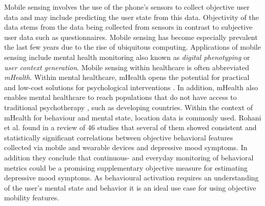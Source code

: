 Mobile sensing involves the use of the phone's sensors to collect objective user data and may include predicting the user state from this data. Objectivity of the data stems from the data being collected from sensors in contrast to subjective user data such as questionnaires. Mobile sensing has become especially prevalent the last few years due to the rise of ubiquitous computing. Applications of mobile sensing include mental health monitoring also known as \textit{digital phenotyping} or \textit{user context generation}. Mobile sensing within healthcare is often abbreviated \textit{mHealth}. Within mental healthcare, mHealth opens the potential for practical and low-cost solutions for psychological interventions \cite{mobile-based-interventions}. In addition, mHealth also enables mental healthcare to reach populations that do not have access to traditional psychotherapy \cite{future-mental-health}, such as developing countries. Within the context of mHealth for behaviour and mental state, location data is commonly used. Rohani et al. \cite{rohani2018-correlations} found in a review of 46 studies that several of them showed consistent and statistically significant correlations between objective behavioral features collected via mobile and wearable devices and depressive mood symptoms. In addition they conclude that continuous- and everyday monitoring of behavioral metrics could be a promising supplementary objective measure for estimating depressive mood symptoms. As behavioural activation requires an understanding of the user's mental state and behavior it is an ideal use case for using objective mobility features. \\

